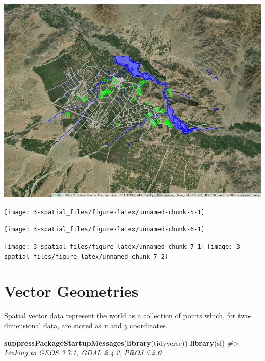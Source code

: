 \documentclass[
]{report}
\newenvironment{Shaded}{\begin{snugshade}}{\end{snugshade}}
\newcommand{\CommentTok}[1]{\textcolor[rgb]{0.56,0.35,0.01}{\textit{#1}}}
\newcommand{\KeywordTok}[1]{\textcolor[rgb]{0.13,0.29,0.53}{\textbf{#1}}}
\newcommand{\NormalTok}[1]{#1}
\begin{document}
\begin{center}\includegraphics[width=1\linewidth]{images/osm_all} \end{center}

\begin{center}\texttt{[image: 3-spatial\_files/figure-latex/unnamed-chunk-5-1]} \end{center}

\begin{center}\texttt{[image: 3-spatial\_files/figure-latex/unnamed-chunk-6-1]} \end{center}

\begin{center}\texttt{[image: 3-spatial\_files/figure-latex/unnamed-chunk-7-1]} \texttt{[image: 3-spatial\_files/figure-latex/unnamed-chunk-7-2]} \end{center}

\hypertarget{vector-geometries}{%
\chapter{Vector Geometries}\label{vector-geometries}}

Spatial vector data represent the world as a collection of points which, for two-dimensional data, are stored as \(x\) and \(y\) coordinates.

\begin{Shaded}
\begin{Highlighting}[]
\KeywordTok{suppressPackageStartupMessages}\NormalTok{(}\KeywordTok{library}\NormalTok{(tidyverse))}
\KeywordTok{library}\NormalTok{(sf)}
\CommentTok{\#\textgreater{} Linking to GEOS 3.7.1, GDAL 2.4.2, PROJ 5.2.0}
\end{Highlighting}
\end{Shaded}
\end{document}
